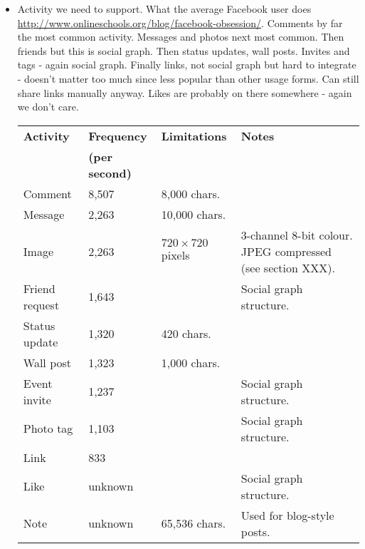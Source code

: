 \begin{itemize}
   
    \item Activity we need to support. What the average Facebook user does \url{http://www.onlineschools.org/blog/facebook-obsession/}. Comments by far the most common activity. Messages and photos next most common. Then friends  but this is social graph. Then status updates, wall posts. Invites and tags - again social graph. Finally links, not social graph but hard to integrate - doesn't matter too much since less popular than other usage forms. Can still share links manually anyway. Likes are probably on there somewhere - again we don't care.

\begin{table}[h]
  \begin{center}
        \begin{tabular}{l l l l}
            
            \textbf{Activity} & \textbf{ Frequency } & \textbf{Limitations} & \textbf{Notes} \\
            & \textbf{(per second)} & & \\
            
            \midrule
            
            Comment         & 8,507    & 8,000 chars.   & \\ 
            Message         & 2,263    & 10,000 chars.  & \\
            Image           & 2,263    & $720 \times 720$ pixels   & \parbox[t][][t]{20ex}{\raggedright 3-channel 8-bit colour. JPEG compressed (see section XXX). } \\ [9ex]
            Friend request  & 1,643    &                & \parbox[t][][t]{20ex}{\raggedright Social graph structure.}  \\ [3ex]
            Status update   & 1,320    & 420 chars.     & \\
            Wall post       & 1,323    & 1,000 chars.   & \\
            Event invite    & 1,237    &                & \parbox[t][][t]{20ex}{\raggedright Social graph structure.}  \\[3ex]
            Photo tag       & 1,103    &                & \parbox[t][][t]{20ex}{\raggedright Social graph structure.}  \\[3ex]
            Link            & 833      &                & \parbox[t][][t]{20ex}{\raggedright }  \\
            Like            & unknown  &                & \parbox[t][][t]{20ex}{\raggedright Social graph structure.}  \\[3ex]
            Note            & unknown  & 65,536 chars.  & \parbox[t][][t]{20ex}{\raggedright Used for blog-style posts.} \\[3ex]
            

\end{tabular}
\end{center}
\end{table}
\end{itemize}
